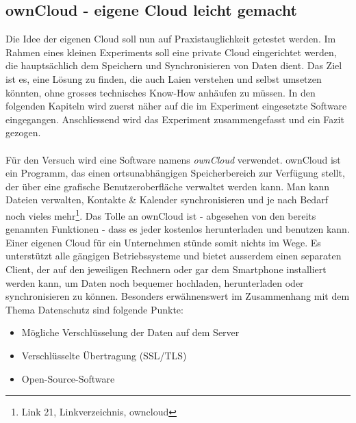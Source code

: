 \subsection{ownCloud - eigene Cloud leicht gemacht}
Die Idee der eigenen Cloud soll nun auf Praxistauglichkeit getestet werden. Im Rahmen eines kleinen Experiments soll eine private Cloud eingerichtet werden, die hauptsächlich dem Speichern und Synchronisieren von Daten dient. Das Ziel ist es, eine Lösung zu finden, die auch Laien verstehen und selbst umsetzen könnten, ohne grosses technisches Know-How anhäufen zu müssen. In den folgenden Kapiteln wird zuerst näher auf die im Experiment eingesetzte Software eingegangen. Anschliessend wird das Experiment zusammengefasst und ein Fazit gezogen.
\\
\\
Für den Versuch wird eine Software namens \textit{ownCloud} verwendet. ownCloud ist ein Programm, das einen ortsunabhängigen Speicherbereich zur Verfügung stellt, der über eine grafische Benutzeroberfläche verwaltet werden kann. Man kann Dateien verwalten, Kontakte \& Kalender synchronisieren und je nach Bedarf noch vieles mehr\footnote{Link 21, Linkverzeichnis, owncloud}.
Das Tolle an ownCloud ist - abgesehen von den bereits genannten Funktionen - dass es jeder kostenlos herunterladen und benutzen kann. Einer eigenen Cloud für ein Unternehmen stünde somit nichts im Wege. Es unterstützt alle gängigen Betriebssysteme und bietet ausserdem einen separaten Client, der auf den jeweiligen Rechnern oder gar dem Smartphone installiert werden kann, um Daten noch bequemer hochladen, herunterladen oder synchronisieren zu können.
Besonders erwähnenswert im Zusammenhang mit dem Thema Datenschutz sind folgende Punkte:

\begin{itemize}
\item Mögliche Verschlüsselung der Daten auf dem Server
\item Verschlüsselte Übertragung (SSL/TLS)
\item Open-Source-Software
\end{itemize}

